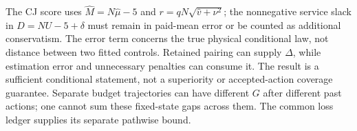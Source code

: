The CJ score uses $\widehat M=N\widehat\mu-5$ and
$r=qN\sqrt{\widehat v+\nu^2}$; the nonnegative service slack in
$D=NU-5+\delta$ must remain in paid-mean error or be counted as additional
conservatism.  The error term concerns the true physical conditional law,
not distance between two fitted controls.  Retained pairing can supply
$\Delta$, while estimation error and unnecessary penalties can consume it.
The result is a sufficient conditional statement, not a superiority or
accepted-action coverage guarantee.  Separate budget trajectories can have
different $G$ after different past actions; one cannot sum these fixed-state
gaps across them.  The common loss ledger supplies its separate pathwise bound.
